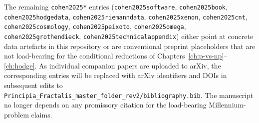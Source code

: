 The remaining \texttt{cohen2025*} entries
(\texttt{cohen2025software}, \texttt{cohen2025book},
\texttt{cohen2025hodgedata}, \texttt{cohen2025riemanndata},
\texttt{cohen2025xenon}, \texttt{cohen2025cnt},
\texttt{cohen2025cosmology}, \texttt{cohen2025peixoto},
\texttt{cohen2025omega}, \texttt{cohen2025grothendieck},
\texttt{cohen2025technicalappendix}) either point at concrete data
artefacts in this repository or are conventional preprint placeholders
that are not load-bearing for the conditional reductions of
Chapters~\ref{ch:p-vs-np}--\ref{ch:hodge}. As individual companion
papers are uploaded to arXiv, the corresponding entries will be
replaced with arXiv identifiers and DOIs in subsequent edits to
\texttt{Principia\_Fractalis\_master\_folder\_rev2/bibliography.bib}.
The manuscript no longer depends on any promissory citation for the
load-bearing Millennium-problem claims.

